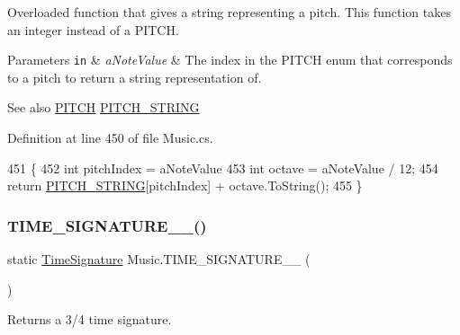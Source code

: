 Overloaded function that gives a string representing a pitch. This function takes an integer instead of a P\+I\+T\+CH. 


\begin{DoxyParams}[1]{Parameters}
\mbox{\tt in}  & {\em a\+Note\+Value} & The index in the P\+I\+T\+CH enum that corresponds to a pitch to return a string representation of.\\
\hline
\end{DoxyParams}
\begin{DoxySeeAlso}{See also}
\hyperlink{group___music_enums_ga508f69b199ea518f935486c990edac1d}{P\+I\+T\+CH} \hyperlink{group___music_constants_ga0f6eb5ac330d374c6b5021a0ba11c2bc}{P\+I\+T\+C\+H\+\_\+\+S\+T\+R\+I\+NG} 
\end{DoxySeeAlso}


Definition at line 450 of file Music.\+cs.


\begin{DoxyCode}
451     \{
452         \textcolor{keywordtype}{int} pitchIndex = aNoteValue %
453         \textcolor{keywordtype}{int} octave = aNoteValue / 12;
454         \textcolor{keywordflow}{return} \hyperlink{group___music_constants_ga0f6eb5ac330d374c6b5021a0ba11c2bc}{PITCH\_STRING}[pitchIndex] + octave.ToString();
455     \}
\end{DoxyCode}
\mbox{\label{group___music_static_func_ga0392e239cbd45a23e5f76f88d0b4c152}} 
\subsubsection{\texorpdfstring{T\+I\+M\+E\+\_\+\+S\+I\+G\+N\+A\+T\+U\+R\+E\+\_\+\_()}{TIME\_SIGNATURE\_3\_4()}}
{\footnotesize\ttfamily static \hyperlink{group___music_structs_struct_music_1_1_time_signature}{Time\+Signature} Music.\+T\+I\+M\+E\+\_\+\+S\+I\+G\+N\+A\+T\+U\+R\+E\+\_\+\_ (\begin{DoxyParamCaption}{ }\end{DoxyParamCaption})\hspace{0.3cm}{\ttfamily [static]}}



Returns a 3/4 time signature. 



